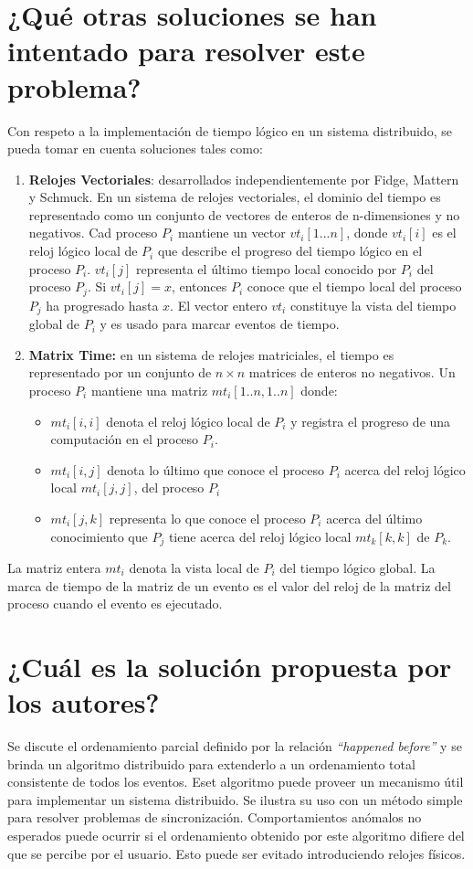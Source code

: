 \section{¿Qué otras soluciones se han intentado para resolver este problema?}
Con respeto a la implementación de tiempo lógico en un sistema distribuido, se pueda tomar en cuenta soluciones tales como:
\begin{enumerate}
    \item \textbf{Relojes Vectoriales}: desarrollados independientemente por Fidge, Mattern y Schmuck. En un sistema de relojes vectoriales, el dominio del tiempo es representado como un conjunto de vectores de enteros de n-dimensiones y no negativos. Cad proceso $P_i$ mantiene un vector $vt_i[1...n]$, donde $vt_i[i]$ es el reloj lógico local de $P_i$ que describe el progreso del tiempo lógico en el proceso $P_i$. $vt_i[j]$ representa el último tiempo local conocido por $P_i$ del proceso $P_j$. Si $vt_i[j] = x$, entonces $P_i$ conoce que el tiempo local del proceso $P_j$ ha progresado hasta $x$. El vector entero $vt_i$ constituye la vista del tiempo global de $P_i$ y es usado para marcar eventos de tiempo.
    \item \textbf{Matrix Time:} en un sistema de relojes matriciales, el tiempo es representado por un conjunto de $n \times n$ matrices de enteros no negativos. Un proceso $P_i$ mantiene una matriz $mt_i[1..n, 1..n]$ donde:
    \begin{itemize}
        \item $mt_i[i, i]$ denota el reloj lógico local de $P_i$ y registra el progreso de una computación en el proceso $P_i$.
        \item $mt_i[i,j]$ denota lo último que conoce el proceso $P_i$ acerca del reloj lógico local $mt_i[j,j]$, del proceso $P_i$ 
        \item $mt_i[j,k]$ representa lo que conoce el proceso $P_i$ acerca del último conocimiento que $P_j$ tiene acerca del reloj lógico local $mt_k[k, k]$ de $P_k$.
    \end{itemize}
\end{enumerate}

La matriz entera $mt_i$ denota la vista local de $P_i$ del tiempo lógico global. La marca de tiempo de la matriz de un evento es el valor del reloj de la matriz del proceso cuando el evento es ejecutado.
     
\section{¿Cuál es la solución propuesta por los autores?}
Se discute el ordenamiento parcial definido por la relación \emph{``happened before''} y se brinda un algoritmo distribuido para extenderlo a un ordenamiento total consistente de todos los eventos. Eset algoritmo puede proveer un mecanismo útil para implementar un sistema distribuido. Se ilustra su uso con un método simple para resolver problemas de sincronización. Comportamientos anómalos no esperados puede ocurrir si el ordenamiento obtenido por este algoritmo difiere del que se percibe por el usuario. Esto puede ser evitado introduciendo relojes físicos. 


